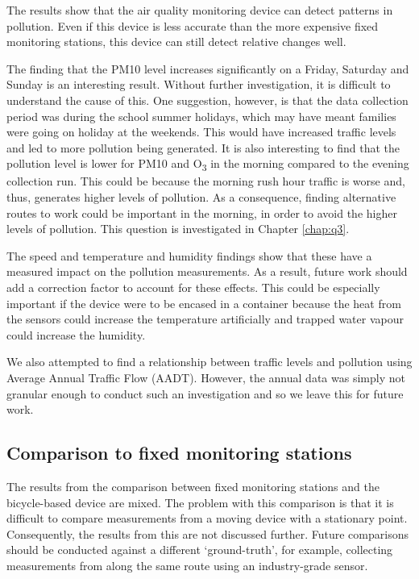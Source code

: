 \documentclass[11pt,twosided,a4paper]{report}
\begin{document}
The results show that the air quality monitoring device can detect patterns in pollution. Even if this device is less accurate than the more expensive fixed monitoring stations, this device can still detect relative changes well.

The finding that the PM10 level increases significantly on a Friday, Saturday and Sunday is an interesting result. Without further investigation, it is difficult to understand the cause of this. One suggestion, however, is that the data collection period was during the school summer holidays, which may have meant families were going on holiday at the weekends. This would have increased traffic levels and led to more pollution being generated. It is also interesting to find that the pollution level is lower for PM10 and O\textsubscript{3} in the morning compared to the evening collection run. This could be because the morning rush hour traffic is worse and, thus, generates higher levels of pollution. As a consequence, finding alternative routes to work could be important in the morning, in order to avoid the higher levels of pollution. This question is investigated in Chapter \ref{chap:q3}.

The speed and temperature and humidity findings show that these have a measured impact on the pollution measurements. As a result, future work should add a correction factor to account for these effects. This could be especially important if the device were to be encased in a container because the heat from the sensors could increase the temperature artificially and trapped water vapour could increase the humidity.

We also attempted to find a relationship between traffic levels and pollution using Average Annual Traffic Flow (AADT). However, the annual data was simply not granular enough to conduct such an investigation and so we leave this for future work.

\subsection{Comparison to fixed monitoring stations}

The results from the comparison between fixed monitoring stations and the bicycle-based device are mixed. The problem with this comparison is that it is difficult to compare measurements from a moving device with a stationary point. Consequently, the results from this are not discussed further. Future comparisons should be conducted against a different `ground-truth', for example, collecting measurements from along the same route using an industry-grade sensor.
\end{document}
